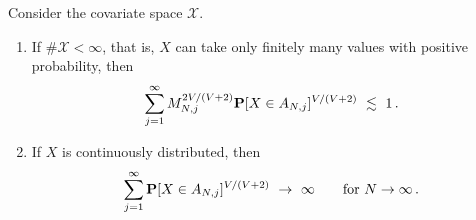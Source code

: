 \begin{lemma}
  \label{lem:x_finite}
  Consider the covariate space $\mathcal{X}$. 
  \begin{enumerate}[label=(\roman*)]
    \item
If $\#\mathcal{X}<\infty$, that is, $X$ can take only finitely many values with positive probability,
then 
\begin{align*}
  \sum_{j=1}^{\infty} 
  M_{N,j}^{2V/(V+2)}
  \P
  [
  X\in A_{N,j}
  ]^{V/(V+2)}
  \ 
  \lesssim
  \ 
  1
  \,.
\end{align*}
\item
  If $X$ is continuously distributed, then
  \begin{align*}
  \sum_{j=1}^{\infty} 
  \P
  [
  X\in A_{N,j}
  ]^{V/(V+2)}
  \ 
  \to
  \ 
  \infty
  \qquad
  \text{for}\ 
  N\to\infty
  \,.
  \end{align*}
  \end{enumerate}
\end{lemma}

